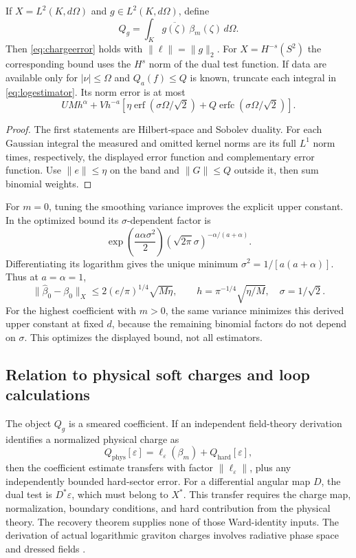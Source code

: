 \begin{corollary}
\label{cor:angularband}
If $X=L^2(K,d\Omega)$ and $g\in L^2(K,d\Omega)$, define
\[
 Q_g=\int_K\overline{g(\zeta)}\,\beta_m(\zeta)\,d\Omega.
\]
Then \eqref{eq:chargeerror} holds with $\|\ell\|=\|g\|_2$.
For $X=H^{-s}(S^2)$ the corresponding bound uses the $H^s$ norm
of the dual test function. If data are available only for
$|\nu|\le\Omega$ and $Q_a(f)\le Q$ is known, truncate each
integral in \eqref{eq:logestimator}. Its norm error is at most
\begin{equation}\label{eq:logband}
 UMh^\alpha+Vh^{-a}\left[
 \eta\operatorname{erf}(\sigma\Omega/\sqrt2)
 +Q\operatorname{erfc}(\sigma\Omega/\sqrt2)\right].
\end{equation}
\end{corollary}
\begin{proof}
The first statements are Hilbert-space and Sobolev duality.
For each Gaussian integral the measured and omitted kernel norms
are its full $L^1$ norm times, respectively, the displayed error
function and complementary error function. Use $\|e\|\le\eta$
on the band and $\|G\|\le Q$ outside it, then sum binomial weights.
\end{proof}

For $m=0$, tuning the smoothing variance improves the explicit upper
constant. In the optimized bound its $\sigma$-dependent factor is
\[
 \exp\!\left(\frac{a\alpha\sigma^2}{2}\right)
 (\sqrt{2\pi}\sigma)^{-\alpha/(a+\alpha)}.
\]
Differentiating its logarithm gives the unique minimum
$\sigma^2=1/[a(a+\alpha)]$. Thus at $a=\alpha=1$,
\begin{equation}\label{eq:improvedconstant}
 \|\widehat\beta_0-\beta_0\|_X
 \le2(e/\pi)^{1/4}\sqrt{M\eta},\qquad
 h=\pi^{-1/4}\sqrt{\eta/M},\quad\sigma=1/\sqrt2.
\end{equation}
For the highest coefficient with $m>0$, the same variance minimizes this derived upper constant
at fixed $d$, because the remaining binomial factors do not depend
on $\sigma$. This optimizes the displayed bound, not all estimators.



\subsection{Relation to physical soft charges and loop calculations}
The object $Q_g$ is a smeared coefficient. If an independent field-theory
derivation identifies a normalized physical charge as
\[
 Q_{\mathrm{phys}}[\varepsilon]
 =\ell_\varepsilon(\beta_m)+Q_{\mathrm{hard}}[\varepsilon],
\]
then the coefficient estimate transfers with factor
$\|\ell_\varepsilon\|$, plus any independently bounded hard-sector
error. For a differential angular map $D$, the dual test is
$D^*\varepsilon$, which must belong to $X^*$.
This transfer requires the charge map, normalization, boundary
conditions, and hard contribution from the physical theory.
The recovery theorem supplies none of those Ward-identity inputs.
The derivation of actual logarithmic graviton charges involves
radiative phase space and dressed fields \cite{wardlogs}.

